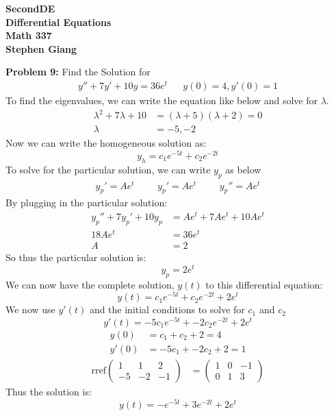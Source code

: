 \documentclass[12pt]{article}
\begin{document}
	
	\begin{center}
		\textbf{SecondDE} \\
		\textbf{Differential Equations} \\
		\textbf{Math 337} \\
		\textbf{Stephen Giang} \\
	\end{center}

\noindent \textbf{Problem 9: }Find the Solution for
	\begin{align*}
		y'' + 7y' + 10y = 36e^t && y(0) = 4, y'(0) = 1 
	\end{align*}
To find the eigenvalues, we can write the equation like below and solve for $\lambda$.
	\begin{align*}
		\lambda^2 + 7\lambda + 10 &= (\lambda + 5)(\lambda + 2) = 0 	\\
		\lambda &= -5, -2 				
	\end{align*}
Now we can write the homogeneous solution as: 
	$$
	y_h = c_1e^{-5t} + c_2e^{-2t}
	$$
To solve for the particular solution, we can write $y_p$ as below
	\begin{align*}
		y_p' = Ae^t &&&
		y_p' = Ae^t &&&
		y_p'' = Ae^t 
	\end{align*}
By plugging in the particular solution:
	\begin{align*}
		y_p'' + 7y_p' + 10y_p &= Ae^t + 7Ae^t + 10Ae^t \\
		18Ae^t &= 36e^t \\
		A &= 2 
	\end{align*}
So thus the particular solution is: 
	$$
	y_p = 2e^t
	$$
We can now have the complete solution, $y(t)$ to this differential equation:
	$$
	y(t)= c_1e^{-5t} + c_2e^{-2t} + 2e^t
	$$
We now use $y'(t)$ and the initial conditions to solve for $c_1$ and $c_2$
	$$
	y'(t) = -5c_1e^{-5t} + -2c_2e^{-2t} + 2e^t
	$$
	\begin{align*}
		y(0)&= c_1 + c_2 + 2 = 4 \\
		y'(0) &= -5c_1 + -2c_2 + 2 = 1 
	\end{align*}
	\begin{align*}
		\text{rref}\begin{pmatrix}
			1 & 1 & 2 \\
			-5 & -2 & -1
		\end{pmatrix} &= 
		\begin{pmatrix}
			1 & 0 & -1 \\
			0 & 1 & 3
		\end{pmatrix}
	\end{align*}
Thus the solution is: 
	$$
	y(t) = -e^{-5t} + 3e^{-2t} + 2e^t
	$$
	
\end{document}
